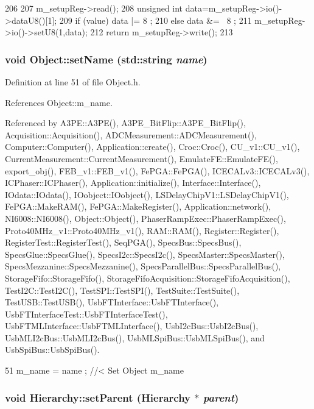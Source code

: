 \begin{DoxyCode}
206                                            {
207   m_setupReg->read();
208   unsigned int data=m_setupReg->io()->dataU8()[1];
209   if (value)  data |=  8 ;
210   else        data &= ~8 ;
211   m_setupReg->io()->setU8(1,data);
212   return m_setupReg->write();
213 }
\end{DoxyCode}
\hypertarget{classObject_ae30fea75683c2d149b6b6d17c09ecd0c}{
\subsubsection[{setName}]{\setlength{\rightskip}{0pt plus 5cm}void Object::setName (std::string {\em name})}}
\label{classObject_ae30fea75683c2d149b6b6d17c09ecd0c}


Definition at line 51 of file Object.h.

References Object::m\_\-name.

Referenced by A3PE::A3PE(), A3PE\_\-BitFlip::A3PE\_\-BitFlip(), Acquisition::Acquisition(), ADCMeasurement::ADCMeasurement(), Computer::Computer(), Application::create(), Croc::Croc(), CU\_\-v1::CU\_\-v1(), CurrentMeasurement::CurrentMeasurement(), EmulateFE::EmulateFE(), export\_\-obj(), FEB\_\-v1::FEB\_\-v1(), FePGA::FePGA(), ICECALv3::ICECALv3(), ICPhaser::ICPhaser(), Application::initialize(), Interface::Interface(), IOdata::IOdata(), IOobject::IOobject(), LSDelayChipV1::LSDelayChipV1(), FePGA::MakeRAM(), FePGA::MakeRegister(), Application::network(), NI6008::NI6008(), Object::Object(), PhaserRampExec::PhaserRampExec(), Proto40MHz\_\-v1::Proto40MHz\_\-v1(), RAM::RAM(), Register::Register(), RegisterTest::RegisterTest(), SeqPGA(), SpecsBus::SpecsBus(), SpecsGlue::SpecsGlue(), SpecsI2c::SpecsI2c(), SpecsMaster::SpecsMaster(), SpecsMezzanine::SpecsMezzanine(), SpecsParallelBus::SpecsParallelBus(), StorageFifo::StorageFifo(), StorageFifoAcquisition::StorageFifoAcquisition(), TestI2C::TestI2C(), TestSPI::TestSPI(), TestSuite::TestSuite(), TestUSB::TestUSB(), UsbFTInterface::UsbFTInterface(), UsbFTInterfaceTest::UsbFTInterfaceTest(), UsbFTMLInterface::UsbFTMLInterface(), UsbI2cBus::UsbI2cBus(), UsbMLI2cBus::UsbMLI2cBus(), UsbMLSpiBus::UsbMLSpiBus(), and UsbSpiBus::UsbSpiBus().


\begin{DoxyCode}
51 { m_name  = name  ; } //< Set Object m_name
\end{DoxyCode}
\hypertarget{classHierarchy_a585ad1aeec16077a0e532ab8b4fc557b}{
\subsubsection[{setParent}]{\setlength{\rightskip}{0pt plus 5cm}void Hierarchy::setParent ({\bf Hierarchy} $\ast$ {\em parent})}}
\label{classHierarchy_a585ad1aeec16077a0e532ab8b4fc557b}


